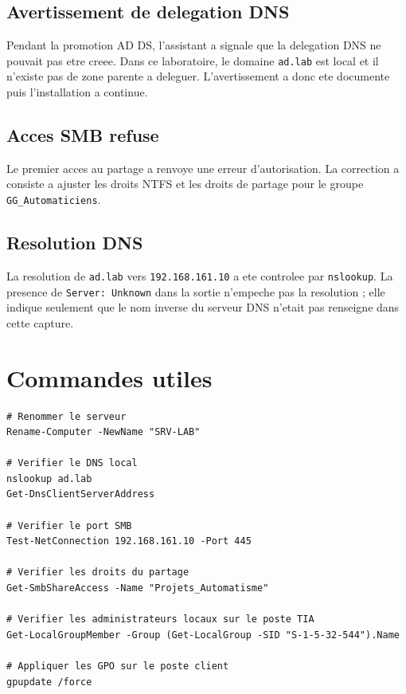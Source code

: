 \documentclass[11pt,a4paper]{article}
\begin{document}
\subsection{Avertissement de delegation DNS}

Pendant la promotion AD DS, l'assistant a signale que la delegation DNS
ne pouvait pas etre creee. Dans ce laboratoire, le domaine
\texttt{ad.lab} est local et il n'existe pas de zone parente a deleguer.
L'avertissement a donc ete documente puis l'installation a continue.

\subsection{Acces SMB refuse}

Le premier acces au partage a renvoye une erreur d'autorisation. La
correction a consiste a ajuster les droits NTFS et les droits de partage
pour le groupe \texttt{GG\_Automaticiens}.

\subsection{Resolution DNS}

La resolution de \texttt{ad.lab} vers \texttt{192.168.161.10} a ete
controlee par \texttt{nslookup}. La presence de \texttt{Server: Unknown}
dans la sortie n'empeche pas la resolution ; elle indique seulement que
le nom inverse du serveur DNS n'etait pas renseigne dans cette capture.

\section{Commandes utiles}

\begin{lstlisting}
# Renommer le serveur
Rename-Computer -NewName "SRV-LAB"

# Verifier le DNS local
nslookup ad.lab
Get-DnsClientServerAddress

# Verifier le port SMB
Test-NetConnection 192.168.161.10 -Port 445

# Verifier les droits du partage
Get-SmbShareAccess -Name "Projets_Automatisme"

# Verifier les administrateurs locaux sur le poste TIA
Get-LocalGroupMember -Group (Get-LocalGroup -SID "S-1-5-32-544").Name

# Appliquer les GPO sur le poste client
gpupdate /force
\end{lstlisting}
\end{document}
